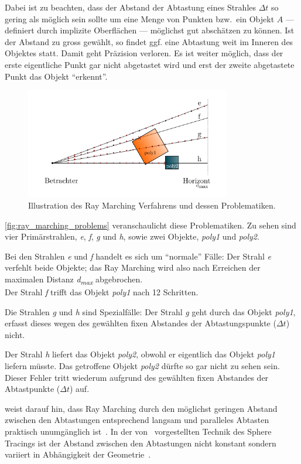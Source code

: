 Dabei ist zu beachten, dass der Abstand der Abtastung eines Strahles
$\Delta{t}$ so gering als möglich sein sollte um eine Menge von Punkten bzw.\ ein
Objekt $A$ --- definiert durch implizite Oberflächen --- möglichst gut
abschätzen zu können. Ist der Abstand zu gross gewählt, so findet ggf.
eine Abtastung weit im Inneren des Objektes statt. Damit geht Präzision
verloren. Es ist weiter möglich, dass der erste eigentliche Punkt gar nicht
abgetastet wird und erst der zweite abgetastete Punkt das Objekt ``erkennt''.

\begin{figure}[H]
    \includegraphics[width=0.8\textwidth]{img/ray_marching_problems.pdf}
    \caption{Illustration des Ray Marching Verfahrens und dessen
        Problematiken.\protect\footnotemark}\label{fig:ray_marching_problems}
\end{figure}

\autoref{fig:ray_marching_problems} veranschaulicht diese
Problematiken. Zu sehen sind vier Primärstrahlen, \textit{e},
\textit{f}, \textit{g} und \textit{h},  sowie zwei Objekte,
\textit{poly1} und \textit{poly2}.

Bei den Strahlen \textit{e} und \textit{f} handelt es sich um
``normale'' Fälle: Der Strahl \textit{e} verfehlt beide Objekte;
das Ray Marching wird also nach Erreichen der maximalen Distanz
\textit{d\textsubscript{max}} abgebrochen.\\
Der Strahl \textit{f} trifft das Objekt \textit{poly1} nach 12
Schritten.

Die Strahlen \textit{g} und \textit{h} sind Spezialfälle: Der Strahl
\textit{g} geht durch das Objekt \textit{poly1}, erfasst dieses wegen
des gewählten fixen Abstandes der Abtastungspunkte ($\Delta{t}$) nicht.

Der Strahl \textit{h} liefert das Objekt \textit{poly2}, obwohl er
eigentlich das Objekt \textit{poly1} liefern müsste. Das getroffene
Objekt \textit{poly2} dürfte so gar nicht zu sehen sein. Dieser Fehler
tritt wiederum aufgrund des gewählten fixen Abstandes der Abtastpunkte
($\Delta{t}$) auf.

\citeauthor{hart_sphere_1994} weist darauf hin, dass Ray Marching durch
den möglichst geringen Abstand zwischen den Abtastungen entsprechend
langsam und paralleles Abtasten praktisch unumgänglich ist~\parencite[S.
528]{hart_sphere_1994}. In der von~\citeauthor{hart_sphere_1994} vorgestellten
Technik des Sphere Tracings ist der Abstand zwischen den Abtastungen
nicht konstant sondern variiert in Abhängigkeit der
Geometrie~\parencite[S. 538 bis 540]{hart_sphere_1994}.
